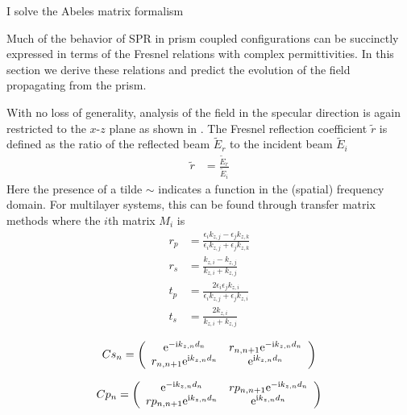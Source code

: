 I solve the Abeles matrix formalism



Much of the behavior of SPR in prism coupled configurations can be
succinctly expressed in terms of the Fresnel relations with complex
permittivities.  In this section we derive these relations and predict the
evolution of the field propagating from the prism.  

With no loss of generality, analysis of the field in the specular direction
is again restricted to the $x$-$z$ plane as shown in .  The
Fresnel reflection coefficient $\tilde{r}$ is defined as the ratio of the
reflected beam $\tilde{E}_r$ to the incident beam
$\tilde{E}_i$
\begin{align}
\tilde{r} &= \frac{\tilde{E}_r}{\tilde{E}_i}
\end{align}
Here the presence of a tilde $\sim$ indicates a function in the (spatial) frequency domain.
For multilayer systems, this can be found through transfer matrix methods where the $i$th matrix $M_i$ is
\begin{align}
r_p &= \frac{\epsilon_i k_{z,j} - \epsilon_j k_{z,k}}{\epsilon_i k_{z,j} + \epsilon_j k_{z,k}} \\
r_s &= \frac{k_{z,i}-k_{z,j}}{k_{z,i}+k_{z,j}}\\
t_p &= \frac{2 \epsilon_i \epsilon_j k_{z,i}}{\epsilon_i k_{z,j} + \epsilon_j k_{z,i}}\\
t_s &= \frac{2 k_{z,i}}{k_{z,i}+k_{z,j}}
\end{align}

\begin{align}
Cs_n = \left(\begin{array}{cc}
{\mathrm{e}}^{-{\mathrm{i}} k_{z,n} d_n} & r_{n,n+1} {\mathrm{e}}^{-{\mathrm{i}} k_{z,n} d_n} \\
r_{n,n+1} {\mathrm{e}}^{{\mathrm{i}} k_{z,n} d_n} & {\mathrm{e}}^{{\mathrm{i}} k_{z,n} d_n} 
\end{array}\right)
\end{align}

\begin{align}
Cp_n = \left(\begin{array}{cc}
{\mathrm{e}}^{-{\mathrm{i}} k_{z,n} d_n} & rp_{n,n+1} {\mathrm{e}}^{-{\mathrm{i}} k_{z,n} d_n} \\
rp_{n,n+1} {\mathrm{e}}^{{\mathrm{i}} k_{z,n} d_n} & {\mathrm{e}}^{{\mathrm{i}} k_{z,n} d_n} 
\end{array}\right)
\end{align}

